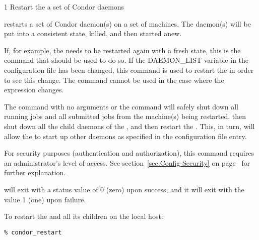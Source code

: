 \begin{ManPage}{\label{man-condor-restart}}{1}
{Restart the a set of Condor daemons}
\Synopsis {}
\ToolArgsBase

\ToolDebugOption
\ToolArgsLocate
\ToolArgsAffect

\ToolDebugOption
\ToolWhere
\ToolArgsAffect


\Description 

 restarts a set of Condor daemon(s) on a set
of machines.
The daemon(s) will be put into a consistent state,
killed, and then started anew.

If, for example, the  needs to be restarted again with
a fresh state, this is the command that should be used to do so.
If the DAEMON\_LIST variable in the configuration file has
been changed, this command is used to restart the 
in order to see this change.
The  command cannot be used in the case where the
 expression changes.

The command
 with no arguments or the command
will safely shut down all running jobs and all submitted
jobs from the machine(s) being restarted, then shut down
all the child daemons of the ,
and then restart the .
This, in turn, will allow the  to start up
other daemons as specified in the  configuration
file entry.

For security purposes (authentication and authorization),
this command requires an administrator's level of access.
See
section~\ref{sec:Config-Security} on page~\pageref{sec:Config-Security}
for further explanation.

\begin{Options}
	\ToolArgsDesc
	\ToolDebugDesc
\end{Options}

\ExitStatus

 will exit with a status value of 0 (zero) upon success,
and it will exit with the value 1 (one) upon failure.

\Examples
To restart the  and all its children
on the local host:
\begin{verbatim}
% condor_restart
\end{verbatim}


\end{ManPage}

